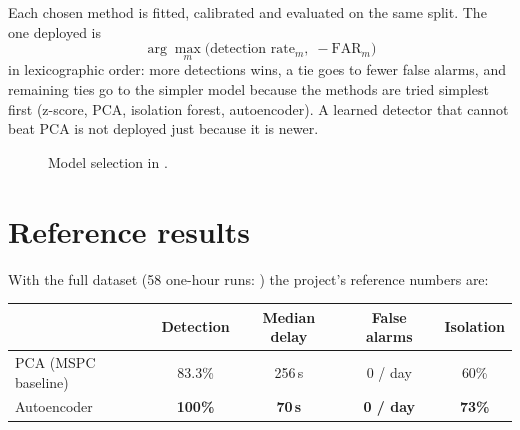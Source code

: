 Each chosen method is fitted, calibrated and evaluated on the same split. The
one deployed is
\begin{equation}
  \arg\max_m \big(\text{detection rate}_m,\; -\text{FAR}_m\big)
\end{equation}
in lexicographic order: more detections wins, a tie goes to fewer false
alarms, and remaining ties go to the simpler model because the methods are
tried simplest first (z-score, PCA, isolation forest, autoencoder). A learned
detector that cannot beat PCA is not deployed just because it is newer.

\begin{figure}[htbp]
\centering
{}
\caption{Model selection in .}
\label{fig:select}
\end{figure}

\section{Reference results}

With the full dataset (58 one-hour runs: ) the project's reference numbers are:

\begin{center}
\begin{tabular}{@{}lcccc@{}}
\toprule
& Detection & Median delay & False alarms & Isolation \\
\midrule
PCA (MSPC baseline) & 83.3\% & 256\,s & 0 / day & 60\% \\
Autoencoder & \textbf{100\%} & \textbf{70\,s} & \textbf{0 / day} & \textbf{73\%} \\
\bottomrule
\end{tabular}
\end{center}

